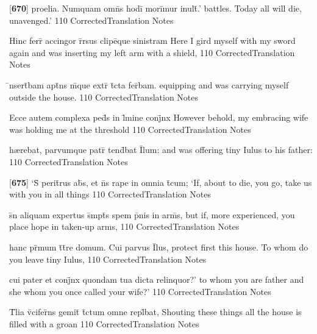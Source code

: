 \latline
  {[\textbf{670}] proelia.  Numquam omn\={}s hodi\={} mori\={}mur inult\={\macron {\i}}.'}
  { battles.  Today all will die, unavenged.' }
  {110}
  { CorrectedTranslation }
  { Notes }


\latline
  {Hinc ferr\={} accingor r\={}rsus clipe\={}que sinistram}
  { Here I gird myself with my sword again and was inserting my left arm with a shield, }
  {110}
  { CorrectedTranslation }
  { Notes }


\latline
  {\={\macron {\i}}nsert\={}bam apt\={}ns m\={}que extr\={} t\={}cta fer\={}bam.}
  { equipping and was carrying myself outside the house.}
  {110}
  { CorrectedTranslation }
  { Notes }


\latline
  {Ecce autem complexa ped\={}s in l\={\macron {\i}}mine conj\={}nx}
  { However behold, my embracing wife was holding me at the threshold  }
  {110}
  { CorrectedTranslation }
  { Notes }


\latline
  {h{\ae}rebat, parvumque patr\={\macron {\i}} tend\={}bat I\={}lum:}
  { and was offering tiny Iulus to his father: }
  {110}
  { CorrectedTranslation }
  { Notes }


\latline
  {[\textbf{675}] `S\={\macron {\i}} perit\={}rus ab\={\macron {\i}}s, et n\={}s rape in omnia t\={}cum;}
  { `If, about to die, you go, take us with you in all things }
  {110}
  { CorrectedTranslation }
  { Notes }


\latline
  {s\={\macron {\i}}n aliquam expertus s\={}mpt\={\macron {\i}}s spem p\={}nis in arm\={\macron {\i}}s,}
  { but if, more experienced, you place hope in taken-up arms, }
  {110}
  { CorrectedTranslation }
  { Notes }


\latline
  {hanc pr\={\macron {\i}}mum t\={}t\={}re domum.  Cui parvus I\={}lus,}
  { protect first this house.  To whom do you leave tiny Iulus,  }
  {110}
  { CorrectedTranslation }
  { Notes }


\latline
  {cui pater et conj\={}nx quondam tua dicta relinquor?'}
  { to whom you are father and she whom you once called your wife?' }
  {110}
  { CorrectedTranslation }
  { Notes }


\latline
  {T\={}lia v\={}cifer\={}ns gemit\={} t\={}ctum omne repl\={}bat,}
  { Shouting these things all the house is filled with a groan }
  {110}
  { CorrectedTranslation }
  { Notes }


